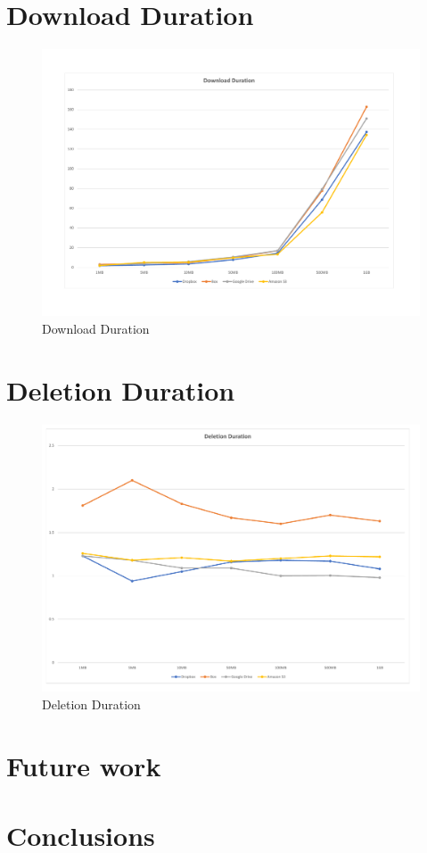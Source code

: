\section{Download Duration}

\begin{figure} [!h]
	\centering
	\includegraphics[scale=0.5]{images/download_chart}
	\caption{\label{fig:download_duration}Download Duration}
\end{figure}

\section{Deletion Duration}

\begin{figure} [!h]
	\centering
	\includegraphics[scale=0.5]{images/deletion_chart}
	\caption{\label{fig:deletion_duration}Deletion Duration}
\end{figure}

\section{Future work}

\section{Conclusions}